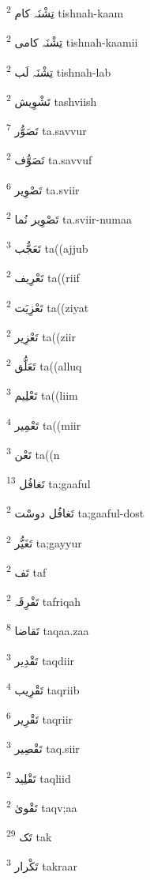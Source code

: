 \documentclass[12pt]{article}
\begin{document}
\begin{RTL}
\begin{multicols}{5}
{\ur تِشْنَہ کام}   \textsuperscript{2} tishnah-kaam

{\ur تِشْنَہ کامی}   \textsuperscript{2} tishnah-kaamii

{\ur تِشْنَہ لَب}   \textsuperscript{2} tishnah-lab

{\ur تَشْوِیش}   \textsuperscript{2} tashviish

{\ur تَصَوُّر}   \textsuperscript{7} ta.savvur

{\ur تَصَوُّف}   \textsuperscript{2} ta.savvuf

{\ur تَصْوِیر}   \textsuperscript{6} ta.sviir

{\ur تَصْوِیر نُما}   \textsuperscript{2} ta.sviir-numaa

{\ur تَعَجُّب}   \textsuperscript{3} ta((ajjub

{\ur تَعْرِیف}   \textsuperscript{2} ta((riif

{\ur تَعْزِیَت}   \textsuperscript{2} ta((ziyat

{\ur تَعْزِیر}   \textsuperscript{2} ta((ziir

{\ur تَعَلُّق}   \textsuperscript{2} ta((alluq

{\ur تَعْلِیم}   \textsuperscript{3} ta((liim

{\ur تَعْمِیر}   \textsuperscript{4} ta((miir

{\ur تَعْن}   \textsuperscript{3} ta((n

{\ur تَغافُل}   \textsuperscript{13} ta;gaaful

{\ur تَغافُل دوسْت}   \textsuperscript{2} ta;gaaful-dost

{\ur تَغَیُّر}   \textsuperscript{2} ta;gayyur

{\ur تَف}   \textsuperscript{2} taf

{\ur تَفْرِقَہ}   \textsuperscript{2} tafriqah

{\ur تَقاضا}   \textsuperscript{8} taqaa.zaa

{\ur تَقْدِیر}   \textsuperscript{3} taqdiir

{\ur تَقْرِیب}   \textsuperscript{4} taqriib

{\ur تَقْرِیر}   \textsuperscript{6} taqriir

{\ur تَقْصِیر}   \textsuperscript{3} taq.siir

{\ur تَقْلِید}   \textsuperscript{2} taqliid

{\ur تَقْویٰ}   \textsuperscript{2} taqv;aa

{\ur تَک}   \textsuperscript{29} tak

{\ur تَکْرار}   \textsuperscript{3} takraar


\end{multicols}
\end{RTL}
\end{document}
